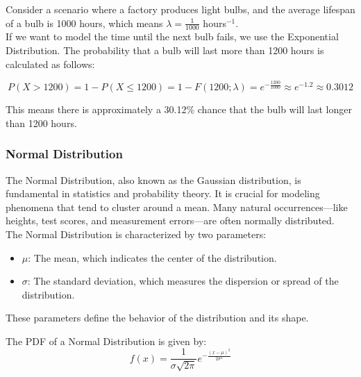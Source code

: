 \begin{example}
    Consider a scenario where a factory produces light bulbs, and the average lifespan of a bulb is 1000 hours, which means $\lambda = \frac{1}{1000}$ hours$^{-1}$. \\

If we want to model the time until the next bulb fails, we use the Exponential Distribution. The probability that a bulb will last more than 1200 hours is calculated as follows:

\[
P(X > 1200) = 1 - P(X \leq 1200) = 1 - F(1200; \lambda) = e^{-\frac{1200}{1000}} \approx e^{-1.2} \approx 0.3012
\]

This means there is approximately a 30.12\% chance that the bulb will last longer than 1200 hours.

\end{example}

\subsubsection{Normal Distribution}

The Normal Distribution, also known as the Gaussian distribution, is fundamental in statistics and probability theory. It is crucial for modeling phenomena that tend to cluster around a mean. Many natural occurrences—like heights, test scores, and measurement errors—are often normally distributed. \\

The Normal Distribution is characterized by two parameters:
\begin{itemize}
    \item $\mu$: The mean, which indicates the center of the distribution.
    \item $\sigma$: The standard deviation, which measures the dispersion or spread of the distribution.
\end{itemize}
These parameters define the behavior of the distribution and its shape.

\begin{definition}
    The PDF of a Normal Distribution is given by:
\[
f(x) = \frac{1}{\sigma \sqrt{2\pi}} e^{-\frac{(x - \mu)^2}{2\sigma^2}}
\]
\end{definition}

